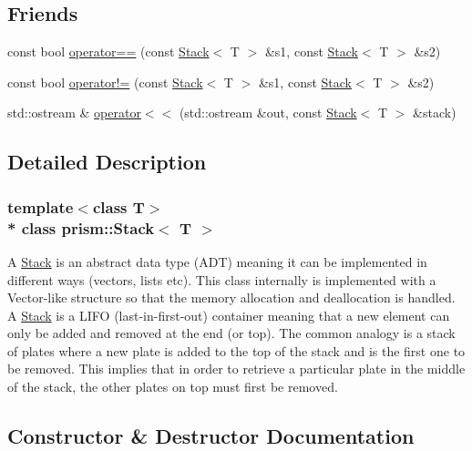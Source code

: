 \subsection*{Friends}
\begin{DoxyCompactItemize}
\item 
const bool \hyperlink{classprism_1_1_stack_aeb1f035d92d81418856c1f1c1bec54b3}{operator==} (const \hyperlink{classprism_1_1_stack}{Stack}$<$ T $>$ \&s1, const \hyperlink{classprism_1_1_stack}{Stack}$<$ T $>$ \&s2)
\item 
const bool \hyperlink{classprism_1_1_stack_aa79914f1e49ebf8bd569580a2113326d}{operator!=} (const \hyperlink{classprism_1_1_stack}{Stack}$<$ T $>$ \&s1, const \hyperlink{classprism_1_1_stack}{Stack}$<$ T $>$ \&s2)
\item 
std\+::ostream \& \hyperlink{classprism_1_1_stack_a7e1f9c28a318f010223ea59ac3d3733a}{operator$<$$<$} (std\+::ostream \&out, const \hyperlink{classprism_1_1_stack}{Stack}$<$ T $>$ \&stack)
\end{DoxyCompactItemize}


\subsection{Detailed Description}
\subsubsection*{template$<$class T$>$\\*
class prism\+::\+Stack$<$ T $>$}

A \hyperlink{classprism_1_1_stack}{Stack} is an abstract data type (A\+DT) meaning it can be implemented in different ways (vectors, lists etc). This class internally is implemented with a Vector-\/like structure so that the memory allocation and deallocation is handled.~\newline
A \hyperlink{classprism_1_1_stack}{Stack} is a L\+I\+FO (last-\/in-\/first-\/out) container meaning that a new element can only be added and removed at the end (or top). The common analogy is a stack of plates where a new plate is added to the top of the stack and is the first one to be removed. This implies that in order to retrieve a particular plate in the middle of the stack, the other plates on top must first be removed. 

\subsection{Constructor \& Destructor Documentation}
